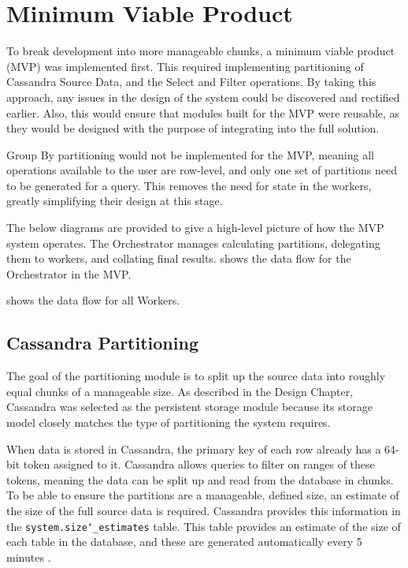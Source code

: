 \section{Minimum Viable Product}
To break development into more manageable chunks, a minimum viable product (MVP) was implemented first. This required implementing partitioning of Cassandra Source Data, and the Select and Filter operations. By taking this approach, any issues in the design of the system could be discovered and rectified earlier. Also, this would ensure that modules built for the MVP were reusable, as they would be designed with the purpose of integrating into the full solution.

Group By partitioning would not be implemented for the MVP, meaning all operations available to the user are row-level, and only one set of partitions need to be generated for a query. This removes the need for state in the workers, greatly simplifying their design at this stage.

The below diagrams are provided to give a high-level picture of how the MVP system operates. The Orchestrator manages calculating partitions, delegating them to workers, and collating final results. 
 shows the data flow for the Orchestrator in the MVP.


 shows the data flow for all Workers.


\subsection{Cassandra Partitioning}
The goal of the partitioning module is to split up the source data into roughly equal chunks of a manageable size. As described in the Design Chapter, Cassandra was selected as the persistent storage module because its storage model closely matches the type of partitioning the system requires. 

When data is stored in Cassandra, the primary key of each row already has a 64-bit token assigned to it. Cassandra allows queries to filter on ranges of these tokens, meaning the data can be split up and read from the database in chunks. To be able to ensure the partitions are a manageable, defined size, an estimate of the size of the full source data is required. Cassandra provides this information in the \texttt{system.size\char`_estimates} table. This table provides an estimate of the size of each table in the database, and these are generated automatically every 5 minutes .

